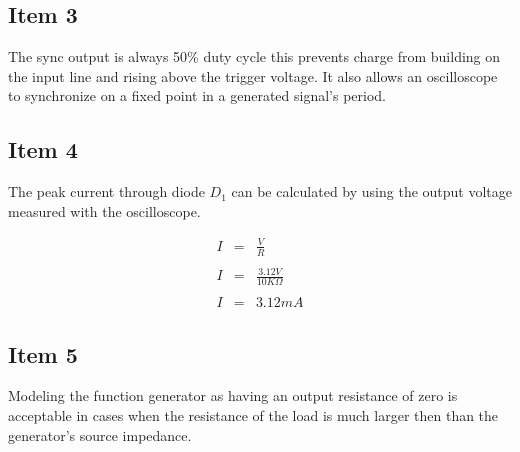 \documentclass[11pt,journal]{IEEEtran}
\begin{document}
		\subsection{Item 3}
		The sync output is always 50\% duty cycle this prevents charge from building on the input line and rising above the trigger voltage. It also allows an oscilloscope to synchronize on a fixed point in
		a generated signal's period. 
		 
		\subsection{Item 4}
		The peak current through diode $D_1$ can be calculated by using the output voltage measured with the oscilloscope.
		
		\begin{eqnarray*}
			I &=& \frac{V}{R}\\ \\
			I &=& \frac{3.12V}{10K\Omega}\\ \\
			I &=& 3.12mA
		\end{eqnarray*}
		
		\subsection{Item 5}
		Modeling the function generator as having an output resistance of zero is acceptable in cases when the resistance of the load is
		much larger then than the generator's source impedance. 
		
		
	
	
\end{document}

